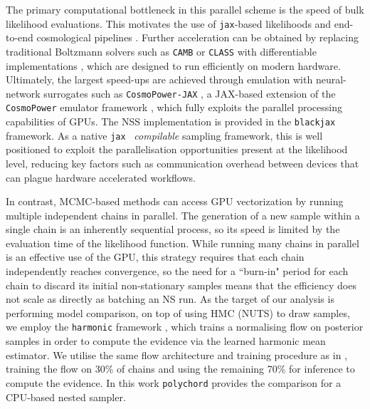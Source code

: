 \documentclass[twocolumn]{openjournal}
\begin{document}
The primary computational bottleneck in this parallel scheme is the speed of bulk likelihood evaluations. This motivates the use of \texttt{jax}-based likelihoods and end-to-end cosmological pipelines \citep[e.g.][]{jaxcosmo, Ruiz_Zapatero_2024, Balkenhol_2024}. Further acceleration can be obtained by replacing traditional Boltzmann solvers such as \texttt{CAMB} \citep{Lewis11} or \texttt{CLASS} \citep{Diego_Blas_2011} with differentiable implementations \citep[e.g.][]{DISCO}, which are designed to run efficiently on modern hardware. Ultimately, the largest speed-ups are achieved through emulation with neural-network surrogates such as \texttt{CosmoPower-JAX} \citep{Piras_2023}, a JAX-based extension of the \texttt{CosmoPower} emulator framework \citep{SpurioMancini22CosmoPower}, which fully exploits the parallel processing capabilities of GPUs. 
The NSS implementation is provided in the \texttt{blackjax}~\citep{cabezas_blackjax_2024} framework. As a native \texttt{jax}~\citep{deepmind_deepmind_2020} \emph{compilable} sampling framework, this is well positioned to exploit the parallelisation opportunities present at the likelihood level, reducing key factors such as communication overhead between devices that can plague hardware accelerated workflows.

In contrast, MCMC-based methods can access GPU vectorization by running multiple independent chains in parallel. The generation of a new sample within a single chain is an inherently sequential process, so its speed is limited by the evaluation time of the likelihood function. While running many chains in parallel is an effective use of the GPU, this strategy requires that each chain independently reaches convergence, so the need for a ``burn-in" period for each chain to discard its initial non-stationary samples \citep{hoffman14a} means that the efficiency does not scale as directly as batching an NS run. As the target of our analysis is performing model comparison, on top of using HMC (NUTS) to draw samples, we employ the \texttt{harmonic} framework \citep{mcewen2023machinelearningassistedbayesian}, which trains a normalising flow on posterior samples in order to compute the evidence via the learned harmonic mean estimator. We utilise the same flow architecture and training procedure as in \citep{Piras_2024}, training the flow on 30\% of chains and using the remaining 70\% for inference to compute the evidence. In this work \texttt{polychord} \citep{polychord,Polychord2} provides the comparison for a CPU-based nested sampler.
\end{document}
